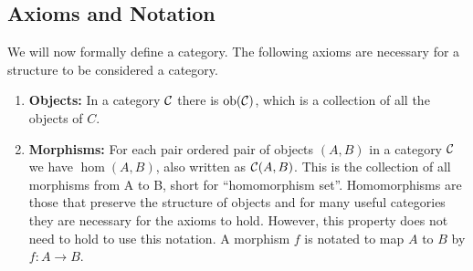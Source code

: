 \documentclass[10pt,a4paper,reqno]{amsart}
\numberwithin{figure}{section}
\begin{document}
\subsection{Axioms and Notation}
We will now formally define a category. The following axioms are necessary for a
structure to be considered a category.
\begin{enumerate}
        \item \textbf{Objects:} In a category $\mathcal{C}$ there is
        $\operatorname{ob}(\mathcal{C})$, which is a collection of all the objects of $C$.

        \item \textbf{Morphisms:} For each pair ordered pair of objects $(A,B)$
        in a category $\mathcal{C}$ we have $\hom(A,B)$, also written as
        $\mathcal{C}(A,B)$.  This is the collection of all morphisms from A to B,
        short for ``homomorphism set''. Homomorphisms are those that preserve
        the structure of objects and for many useful categories they are
        necessary for the axioms to hold. However, this property does not need
        to hold to use this notation. A morphism $f$ is notated to map $A$ to
        $B$ by $f: A\to B$.


\end{enumerate}
\end{document}

